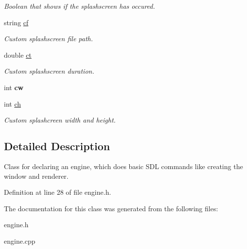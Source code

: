 \begin{DoxyCompactItemize}
\begin{DoxyCompactList}\small\item\em Boolean that shows if the splashscreen has occured. \end{DoxyCompactList}\item 
string \hyperlink{classEngine_af5917b4f27bb16bf68b074b62c0e5587}{cf}\hypertarget{classEngine_af5917b4f27bb16bf68b074b62c0e5587}{}\label{classEngine_af5917b4f27bb16bf68b074b62c0e5587}

\begin{DoxyCompactList}\small\item\em Custom splashscreen file path. \end{DoxyCompactList}\item 
double \hyperlink{classEngine_a6e76eccd4f6e976a2068b9eb0acb4e85}{ct}\hypertarget{classEngine_a6e76eccd4f6e976a2068b9eb0acb4e85}{}\label{classEngine_a6e76eccd4f6e976a2068b9eb0acb4e85}

\begin{DoxyCompactList}\small\item\em Custom splashscreen duration. \end{DoxyCompactList}\item 
int {\bfseries cw}\hypertarget{classEngine_aff6e103dd58c2ea3b7798e7bc52db361}{}\label{classEngine_aff6e103dd58c2ea3b7798e7bc52db361}

\item 
int \hyperlink{classEngine_a2acd0bd074160e654d076376d36a3479}{ch}\hypertarget{classEngine_a2acd0bd074160e654d076376d36a3479}{}\label{classEngine_a2acd0bd074160e654d076376d36a3479}

\begin{DoxyCompactList}\small\item\em Custom splashcreen width and height. \end{DoxyCompactList}\end{DoxyCompactItemize}


\subsection{Detailed Description}
Class for declaring an engine, which does basic S\+DL commands like creating the window and renderer. 

Definition at line 28 of file engine.\+h.



The documentation for this class was generated from the following files\+:\begin{DoxyCompactItemize}
\item 
engine.\+h\item 
engine.\+cpp\end{DoxyCompactItemize}
